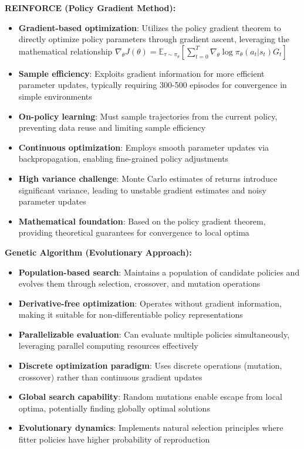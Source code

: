 \documentclass[12pt]{article}
\begin{document}
{{{\textbf{REINFORCE (Policy Gradient Method):}
\begin{itemize}
    \item \textbf{Gradient-based optimization}: Utilizes the policy gradient theorem to directly optimize policy parameters through gradient ascent, leveraging the mathematical relationship $\nabla_\theta J(\theta) = \mathbb{E}_{\tau \sim \pi_\theta}[\sum_{t=0}^{T} \nabla_\theta \log \pi_\theta(a_t|s_t) G_t]$
    \item \textbf{Sample efficiency}: Exploits gradient information for more efficient parameter updates, typically requiring 300-500 episodes for convergence in simple environments
    \item \textbf{On-policy learning}: Must sample trajectories from the current policy, preventing data reuse and limiting sample efficiency
    \item \textbf{Continuous optimization}: Employs smooth parameter updates via backpropagation, enabling fine-grained policy adjustments
    \item \textbf{High variance challenge}: Monte Carlo estimates of returns introduce significant variance, leading to unstable gradient estimates and noisy parameter updates
    \item \textbf{Mathematical foundation}: Based on the policy gradient theorem, providing theoretical guarantees for convergence to local optima
\end{itemize}

\textbf{Genetic Algorithm (Evolutionary Approach):}
\begin{itemize}
    \item \textbf{Population-based search}: Maintains a population of candidate policies and evolves them through selection, crossover, and mutation operations
    \item \textbf{Derivative-free optimization}: Operates without gradient information, making it suitable for non-differentiable policy representations
    \item \textbf{Parallelizable evaluation}: Can evaluate multiple policies simultaneously, leveraging parallel computing resources effectively
    \item \textbf{Discrete optimization paradigm}: Uses discrete operations (mutation, crossover) rather than continuous gradient updates
    \item \textbf{Global search capability}: Random mutations enable escape from local optima, potentially finding globally optimal solutions
    \item \textbf{Evolutionary dynamics}: Implements natural selection principles where fitter policies have higher probability of reproduction
\end{itemize}

}}}
\end{document}
